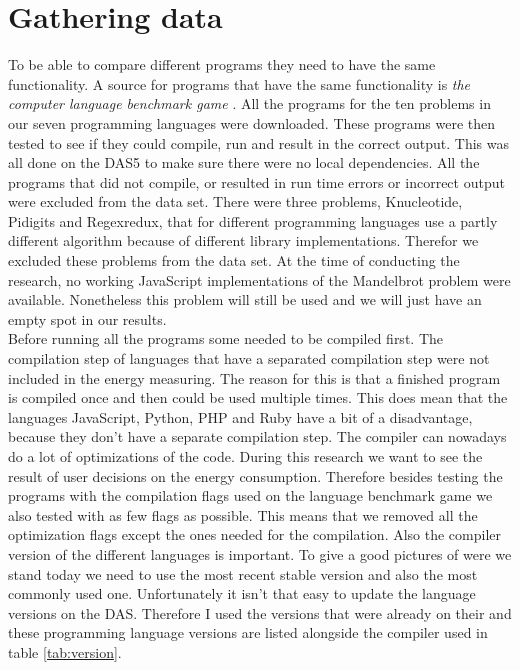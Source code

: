 \section{Gathering data}
To be able to compare different programs they need to have the same functionality. A source for programs that have the same functionality is  \textit{the computer language benchmark game} \cite{gouy:2019}. All the programs for the ten problems in our seven programming languages were downloaded. These programs were then tested to see if they could compile, run and result in the correct output. This was all done on the DAS5 to make sure there were no local dependencies. All the programs that did not compile, or resulted in run time errors or incorrect output were excluded from the data set. There were three problems, Knucleotide, Pidigits and Regexredux, that for different programming languages use a partly different algorithm because of different library implementations. Therefor we excluded these problems from the data set. At the time of conducting the research, no working JavaScript implementations of the Mandelbrot problem were available. Nonetheless this problem will still be used and we will just have an empty spot in our results.\\


Before running all the programs some needed to be compiled first. The compilation step of languages that have a separated compilation step were not included in the energy measuring. The reason for this is that a finished program is compiled once and then could be used multiple times. This does mean that the languages JavaScript, Python, PHP and Ruby have a bit of a disadvantage, because they don't have a separate compilation step. The compiler can nowadays do a lot of optimizations of the code. During this research we want to see the result of user decisions on the energy consumption. Therefore besides testing the programs with the compilation flags used on the language benchmark game we also tested with as few flags as possible. This means that we removed all the optimization flags except the ones needed for the compilation. Also the compiler version of the different languages is important. To give a good pictures of were we stand today we need to use the most recent stable version and also the most commonly used one. Unfortunately it isn't that easy to update the language versions on the DAS. Therefore I used the versions that were already on their and these programming language versions are listed alongside the compiler used in table \ref{tab:version}.

